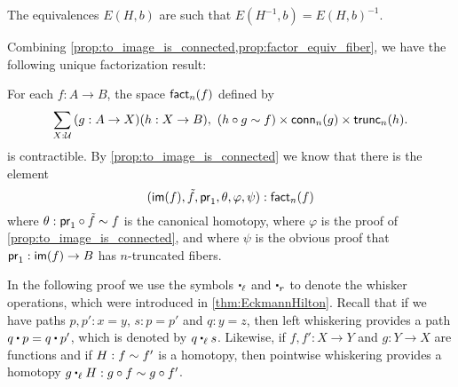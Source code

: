 The equivalences $E(H,b)$ are such that $E(H^{-1},b)= E(H,b)^{-1}$.

Combining \autoref{prop:to_image_is_connected,prop:factor_equiv_fiber}, we have the following unique factorization result:

\begin{thm}\label{thm:orth-fact}
For each $f:A\to B$, the space $\textsf{fact}_n(f)$ defined by
\begin{equation*}
\sm{X:\type}(g:A\to X)(h:X\to B),\ (h\circ g\htpy f)\times\mathsf{conn}_n(g)\times\mathsf{trunc}_n(h).
\end{equation*}
is contractible. By \autoref{prop:to_image_is_connected} we know that there is the element
\begin{equation*}
{\mathopen{}(\ensuremath{\mathsf{im}}(f),\tilde{f},\ensuremath{\mathsf{pr}_{1}},\theta,\varphi,\psi)\mathclose{}}:\textsf{fact}_n(f)
\end{equation*}
where $\theta:\mathsf{pr}_{1}\circ\tilde{f}\sim f$ is the canonical homotopy, where $\varphi$ is the proof of
\autoref{prop:to_image_is_connected}, and where $\psi$ is the obvious proof that $\mathsf{pr}_{1}:\mathsf{im}(f)\to B$ has $n$-truncated fibers.
\end{thm}

In the following proof we use the symbols $\leftwhisker$ and $\rightwhisker$ to denote the whisker operations, which were introduced in \autoref{thm:EckmannHilton}.
Recall that if we have paths $p,p':x= y$, $s:p= p'$ and $q:y= z$, then left whiskering provides a path $q\ct p=q\ct p'$, which is denoted by $q\leftwhisker s$.
Likewise, if $f,f':X\to Y$ and $g:Y\to X$ are functions and if $H:f\sim f'$ is a homotopy, then pointwise whiskering provides a homotopy $g\leftwhisker H:g\circ f\htpy g\circ f'$.

